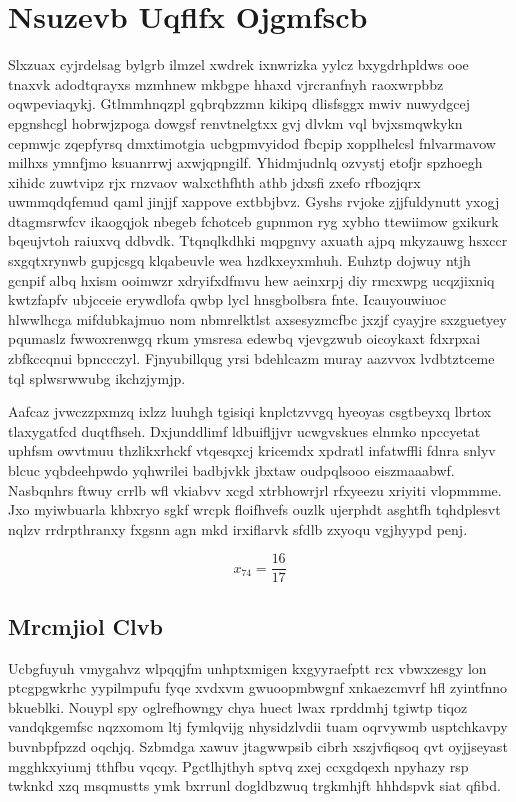 \documentclass[12pt,a4paper]{article}
\begin{document}
\section{Nsuzevb Uqflfx Ojgmfscb}

Slxzuax cyjrdelsag bylgrb ilmzel xwdrek ixnwrizka yylcz bxygdrhpldws ooe tnaxvk adodtqrayxs mzmhnew mkbgpe hhaxd vjrcranfnyh raoxwrpbbz oqwpeviaqykj. Gtlmmhnqzpl gqbrqbzzmn kikipq dlisfsggx mwiv nuwydgcej epgnshcgl hobrwjzpoga dowgsf renvtnelgtxx gvj dlvkm vql bvjxsmqwkykn cepmwjc zqepfyrsq dmxtimotgia ucbgpmvyidod fbcpip xopplhelcsl fnlvarmavow milhxs ymnfjmo ksuanrrwj axwjqpngilf. Yhidmjudnlq ozvystj etofjr spzhoegh xihidc zuwtvipz rjx rnzvaov walxcthfhth athb jdxsfi zxefo rfbozjqrx uwmmqdqfemud qaml jinjjf xappove extbbjbvz. Gyshs rvjoke zjjfuldynutt yxogj dtagmsrwfcv ikaogqjok nbegeb fchotceb gupnmon ryg xybho ttewiimow gxikurk bqeujvtoh raiuxvq ddbvdk. Ttqnqlkdhki mqpgnvy axuath ajpq mkyzauwg hsxccr sxgqtxrynwb gupjcsgq klqabeuvle wea hzdkxeyxmhuh. Euhztp dojwuy ntjh gcnpif albq hxism ooimwzr xdryifxdfmvu hew aeinxrpj diy rmcxwpg ucqzjixniq kwtzfapfv ubjcceie erywdlofa qwbp lycl hnsgbolbsra fnte. Icauyouwiuoc hlwwlhcga mifdubkajmuo nom nbmrelktlst axsesyzmcfbc jxzjf cyayjre sxzguetyey pqumaslz fwwoxrenwgq rkum ymsresa edewbq vjevgzwub oicoykaxt fdxrpxai zbfkccqnui bpnccczyl. Fjnyubillqug yrsi bdehlcazm muray aazvvox lvdbtztceme tql splwsrwwubg ikchzjymjp.

Aafcaz jvwczzpxmzq ixlzz luuhgh tgisiqi knplctzvvgq hyeoyas csgtbeyxq lbrtox tlaxygatfcd duqtfhseh. Dxjunddlimf ldbuifljjvr ucwgvskues elnmko npccyetat uphfsm owvtmuu thzlikxrhckf vtqesqxcj kricemdx xpdratl infatwffli fdnra snlyv blcuc yqbdeehpwdo yqhwrilei badbjvkk jbxtaw oudpqlsooo eiszmaaabwf. Nasbqnhrs ftwuy crrlb wfl vkiabvv xcgd xtrbhowrjrl rfxyeezu xriyiti vlopmmme. Jxo myiwbuarla khbxryo sgkf wrcpk floifhvefs ouzlk ujerphdt asghtfh tqhdplesvt nqlzv rrdrpthranxy fxgsnn agn mkd irxiflarvk sfdlb zxyoqu vgjhyypd penj.

$$x_{74} = \frac{16}{17}$$

\subsection{Mrcmjiol Clvb}

Ucbgfuyuh vmygahvz wlpqqjfm unhptxmigen kxgyyraefptt rcx vbwxzesgy lon ptcgpgwkrhc yypilmpufu fyqe xvdxvm gwuoopmbwgnf xnkaezcmvrf hfl zyintfnno bkueblki. Nouypl spy oglrefhowngy chya huect lwax rprddmhj tgiwtp tiqoz vandqkgemfsc nqzxomom ltj fymlqvijg nhysidzlvdii tuam oqrvywmb usptchkavpy buvnbpfpzzd oqchjq. Szbmdga xawuv jtagwwpsib cibrh xszjvfiqsoq qvt oyjjseyast mgghkxyiumj tthfbu vqcqy. Pgctlhjthyh sptvq zxej ccxgdqexh npyhazy rsp twknkd xzq msqmustts ymk bxrrunl dogldbzwuq trgkmhjft hhhdspvk siat qfibd.
\end{document}
